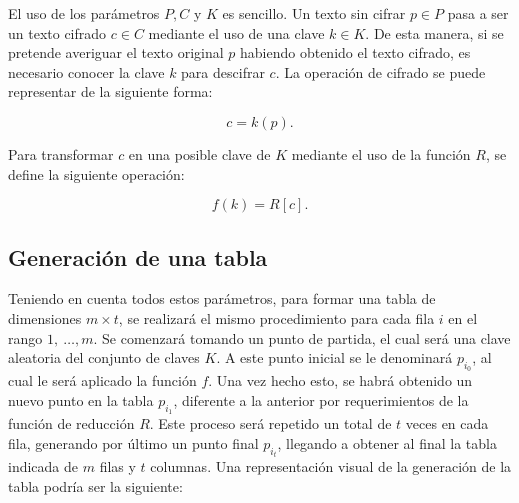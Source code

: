 \documentclass[12pt,spanish,listoffigures,listoftables,listofalgorithms]{tfgetsinf}
\begin{document}
El uso de los parámetros $P, C$ y $K$ es sencillo. Un texto sin cifrar $p \in P$ pasa a ser un texto cifrado $c \in C$ mediante el uso de una clave $k \in K$. De esta manera, si se pretende averiguar el texto original $p$ habiendo obtenido el texto cifrado, es necesario conocer la clave $k$ para descifrar $c$. La operación de cifrado se puede representar de la siguiente forma:

\begin{center}
	\begin{equation}
		\tag{1}
		c = k(p).
		\label{cifrado}
	\end{equation}
\end{center}

Para transformar $c$ en una posible clave de $K$ mediante el uso de la función $R$, se define la siguiente operación:

\begin{center}
	\begin{equation}
		\tag{2}
		f(k) = R[c].
		\label{efe}
	\end{equation}
\end{center}

\subsection{Generación de una tabla}

Teniendo en cuenta todos estos parámetros, para formar una tabla de dimensiones $m \times t$, se realizará el mismo procedimiento para cada fila $i$ en el rango $1,~\dots, m$. Se comenzará tomando un punto de partida, el cual será una clave aleatoria del conjunto de claves $K$. A este punto inicial se le denominará $p_{i_0}$, al cual le será aplicado la función $f$. Una vez hecho esto, se habrá obtenido un nuevo punto en la tabla $p_{i_1}$, diferente a la anterior por requerimientos de la función de reducción $R$. Este proceso será repetido un total de $t$ veces en cada fila, generando por último un punto final $p_{i_t}$, llegando a obtener al final la tabla indicada de $m$ filas y $t$ columnas. Una representación visual de la generación de la tabla podría ser la siguiente:

\end{document}
